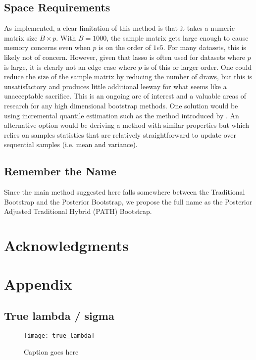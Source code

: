\subsection{Space Requirements}

As implemented, a clear limitation of this method is that it takes a numeric matrix size $B \times p$. With $B = 1000$, the sample matrix gets large enough to cause memory concerns even when $p$ is on the order of $1e5$. For many datasets, this is likely not of concern. However, given that lasso is often used for datasets where $p$ is large, it is clearly not an edge case where $p$ is of this or larger order. One could reduce the size of the sample matrix by reducing the number of draws, but this is unsatisfactory and produces little additional leeway for what seems like a unacceptable sacrifice. This is an ongoing are of interest and a valuable areas of research for any high dimensional bootstrap methods. One solution would be using incremental quantile estimation such as the method introduced by \cite{Tierney1983}. An alternative option would be deriving a method with similar properties but which relies on samples statistics that are relatively straightforward to update over sequential samples (i.e. mean and variance).

\subsection{Remember the Name}

Since the main method suggested here falls somewhere between the Traditional Bootstrap and the Posterior Bootstrap, we propose the full name as the Posterior Adjusted Traditional Hybrid (PATH) Bootstrap.

\section*{Acknowledgments}

\section*{Appendix}

\subsection{True lambda / sigma}

\begin{figure}[hbtp]
  \texttt{[image: true\_lambda]}
  \caption{\label{Fig:true_lambda} Caption goes here}
\end{figure}

